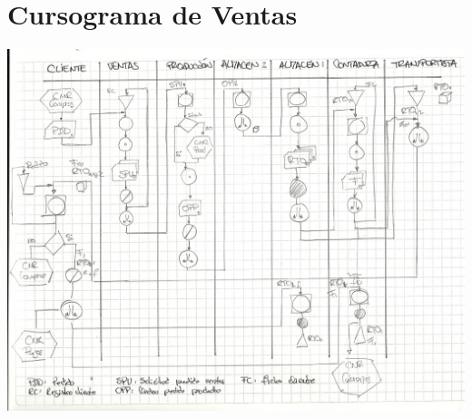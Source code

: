 \section{Cursograma de Ventas}
\includegraphics [angle=90]{Empresa/Circuitos/Ventas/ventas.jpg}

\pagebreak
